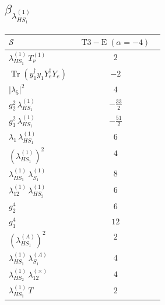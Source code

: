\documentclass[9pt]{article}
\begin{document}
\subsection*{$ \beta_{\lambda_{HS_1}^{(1)}} $}
\begin{longtable}{@{}p{0.31\linewidth}c@{}}
\toprule
$\mathcal{S}$ & $ \mathrm{T3-E}\;(\alpha=-4) $ \\
\midrule
$ \lambda_{HS_1}^{(1)}\,T_{\nu}^{(1)} $ & $ 2 $ \\
$ \operatorname{Tr}(y_1^\dagger y_1Y_e^\dagger Y_e) $ & $ -2 $ \\
$ |\lambda_5|^2 $ & $ 4 $ \\
$ g_2^2\,\lambda_{HS_1}^{(1)} $ & $ - \frac{33}{2} $ \\
$ g_1^2\,\lambda_{HS_1}^{(1)} $ & $ - \frac{51}{2} $ \\
$ \lambda_1\,\lambda_{HS_1}^{(1)} $ & $ 6 $ \\
$ \left(\lambda_{HS_1}^{(1)}\right)^2 $ & $ 4 $ \\
$ \lambda_{HS_1}^{(1)}\,\lambda_{S_1}^{(1)} $ & $ 8 $ \\
$ \lambda_{12}^{(1)}\,\lambda_{HS_2}^{(1)} $ & $ 6 $ \\
$ g_2^4 $ & $ 6 $ \\
$ g_1^4 $ & $ 12 $ \\
$ \left(\lambda_{HS_1}^{(A)}\right)^2 $ & $ 2 $ \\
$ \lambda_{HS_1}^{(1)}\,\lambda_{S_1}^{(A)} $ & $ 4 $ \\
$ \lambda_{HS_2}^{(1)}\,\lambda_{12}^{(\times)} $ & $ 4 $ \\
$ \lambda_{HS_1}^{(1)}\,T $ & $ 2 $ \\
\bottomrule
\end{longtable}
\end{document}
